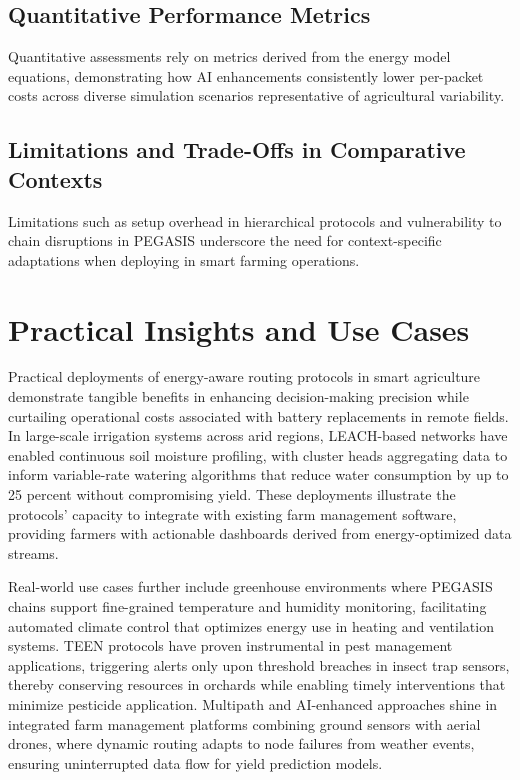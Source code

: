 \documentclass[12pt]{article}
\begin{document}
\subsection{Quantitative Performance Metrics}

Quantitative assessments rely on metrics derived from the energy model equations, demonstrating how AI enhancements consistently lower per-packet costs across diverse simulation scenarios representative of agricultural variability.

\subsection{Limitations and Trade-Offs in Comparative Contexts}

Limitations such as setup overhead in hierarchical protocols and vulnerability to chain disruptions in PEGASIS underscore the need for context-specific adaptations when deploying in smart farming operations.

\section{Practical Insights and Use Cases}

Practical deployments of energy-aware routing protocols in smart agriculture demonstrate tangible benefits in enhancing decision-making precision while curtailing operational costs associated with battery replacements in remote fields. In large-scale irrigation systems across arid regions, LEACH-based networks have enabled continuous soil moisture profiling, with cluster heads aggregating data to inform variable-rate watering algorithms that reduce water consumption by up to 25 percent without compromising yield. These deployments illustrate the protocols' capacity to integrate with existing farm management software, providing farmers with actionable dashboards derived from energy-optimized data streams.

Real-world use cases further include greenhouse environments where PEGASIS chains support fine-grained temperature and humidity monitoring, facilitating automated climate control that optimizes energy use in heating and ventilation systems. TEEN protocols have proven instrumental in pest management applications, triggering alerts only upon threshold breaches in insect trap sensors, thereby conserving resources in orchards while enabling timely interventions that minimize pesticide application. Multipath and AI-enhanced approaches shine in integrated farm management platforms combining ground sensors with aerial drones, where dynamic routing adapts to node failures from weather events, ensuring uninterrupted data flow for yield prediction models.
\end{document}

